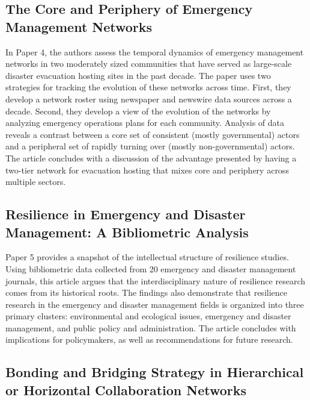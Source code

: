\documentclass{article}
\begin{document}
\subsection{The Core and Periphery of Emergency Management Networks}
In Paper 4, the authors assess the temporal dynamics of emergency management networks in two moderately sized communities that have served as large-scale disaster evacuation hosting sites in the past decade. The paper uses two strategies for tracking the evolution of these networks across time. First, they develop a network roster using newspaper and newswire data sources across a decade. Second, they develop a view of the evolution of the networks by analyzing emergency operations plans for each community. Analysis of data reveals a contrast between a core set of consistent (mostly governmental) actors and a peripheral set of rapidly turning over (mostly non-governmental) actors. The article concludes with a discussion of the advantage presented by having a two-tier network for evacuation hosting that mixes core and periphery across multiple sectors.

\subsection{Resilience in Emergency and Disaster Management: A Bibliometric Analysis}
Paper 5 provides a snapshot of the intellectual structure of resilience studies. Using bibliometric data collected from 20 emergency and disaster management journals, this article argues that the interdisciplinary nature of resilience research comes from its historical roots. The findings also demonstrate that resilience research in the emergency and disaster management fields is organized into three primary clusters: environmental and ecological issues, emergency and disaster management, and public policy and administration. The article concludes with implications for policymakers, as well as recommendations for future research.

\subsection{Bonding and Bridging Strategy in Hierarchical or Horizontal Collaboration Networks}
\end{document}

